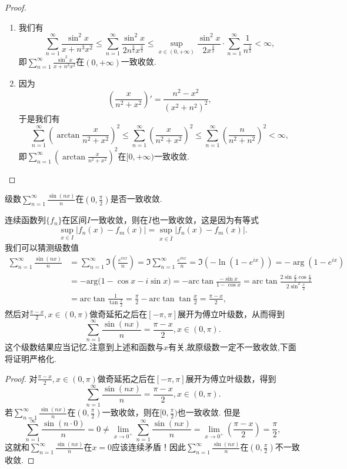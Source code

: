 \documentclass[../../main.tex]{subfiles}
\begin{document}
\begin{proof}
\begin{enumerate}
\item 我们有
\[
\sum_{n=1}^{\infty} \frac{\sin^2 x}{x + n^3 x^2} \leqslant \sum_{n=1}^{\infty} \frac{\sin^2 x}{2n^{\frac{3}{2}} x^{\frac{3}{2}}} \leqslant \sup_{x \in (0, +\infty)} \frac{\sin^2 x}{2x^{\frac{3}{2}}} \cdot \sum_{n=1}^{\infty} \frac{1}{n^{\frac{3}{2}}} < \infty,
\]
即\(\sum_{n=1}^{\infty} \frac{\sin^2 x}{x + n^3 x^2}\)在\((0, +\infty)\)一致收敛.

\item 因为
\[
\left( \frac{x}{n^2 + x^2} \right)' = \frac{n^2 - x^2}{(x^2 + n^2)^2},
\]
于是我们有
\[
\sum_{n=1}^{\infty} \left( \arctan \frac{x}{n^2 + x^2} \right)^2 \leqslant \sum_{n=1}^{\infty} \left( \frac{x}{n^2 + x^2} \right)^2 \leqslant \sum_{n=1}^{\infty} \left( \frac{n}{n^2 + n^2} \right)^2 < \infty,
\]
即\(\sum_{n=1}^{\infty} \left( \arctan \frac{x}{n^2 + x^2} \right)^2\)在\([0, +\infty)\)一致收敛.
\end{enumerate}

\end{proof}

\begin{example}
级数\(\sum_{n=1}^{\infty} \frac{\sin(nx)}{n}\)在\((0, \frac{\pi}{2})\)是否一致收敛.
\end{example}
\begin{note}
连续函数列\(\{f_n\}\)在区间\(I\)一致收敛，则在\(\overline{I}\)也一致收敛，这是因为有等式
\[
\sup_{x \in I} |f_n(x) - f_m(x)| = \sup_{x \in \overline{I}} |f_n(x) - f_m(x)|.
\]
我们可以猜测级数值
\begin{align*}
\sum_{n=1}^{\infty} \frac{\sin(nx)}{n} &= \sum_{n=1}^{\infty} \Im \left( \frac{e^{inx}}{n} \right) = \Im \sum_{n=1}^{\infty} \frac{e^{inx}}{n} = \Im (-\ln(1 - e^{ix})) = -\arg(1 - e^{ix}) \\
&= -\mathrm{arg(}1-\cos x-i\sin x)=-\mathrm{arc}\tan \frac{-\sin x}{1-\cos x}=\mathrm{arc}\tan \frac{2\sin \frac{x}{2}\cos \frac{x}{2}}{2\sin ^2\frac{x}{2}}\\
&= \mathrm{arc}\tan \frac{1}{\tan \frac{x}{2}}=\frac{\pi}{2}-\mathrm{arc}\tan\tan \frac{x}{2}=\frac{\pi -x}{2},
\end{align*}
然后对\(\frac{\pi - x}{2}, x \in (0, \pi)\)做奇延拓之后在\([-\pi, \pi]\)展开为傅立叶级数，从而得到
\[
\sum_{n=1}^{\infty} \frac{\sin(nx)}{n} = \frac{\pi - x}{2}, x \in (0, \pi).
\]
这个级数结果应当记忆.注意到上述和函数与$x$有关,故原级数一定不一致收敛,下面将证明严格化.
\end{note}
\begin{proof}
对\(\frac{\pi - x}{2}, x \in (0, \pi)\)做奇延拓之后在\([-\pi, \pi]\)展开为傅立叶级数，得到
\[
\sum_{n=1}^{\infty} \frac{\sin(nx)}{n} = \frac{\pi - x}{2}, x \in (0, \pi).
\]
若\(\sum_{n=1}^{\infty} \frac{\sin(nx)}{n}\)在\((0, \frac{\pi}{2})\)一致收敛，则在\([0, \frac{\pi}{2})\)也一致收敛. 但是
\[
\sum_{n=1}^{\infty} \frac{\sin(n \cdot 0)}{n} =0 \neq \lim_{x \to 0^+} \sum_{n=1}^{\infty} \frac{\sin(nx)}{n} = \lim_{x \to 0^+} \left( \frac{\pi - x}{2} \right) = \frac{\pi}{2},
\]
这就和\(\sum_{n=1}^{\infty} \frac{\sin(nx)}{n}\)在\(x = 0\)应该连续矛盾！因此\(\sum_{n=1}^{\infty} \frac{\sin(nx)}{n}\)在\((0, \frac{\pi}{2})\)不一致收敛.

\end{proof}
\end{document}
